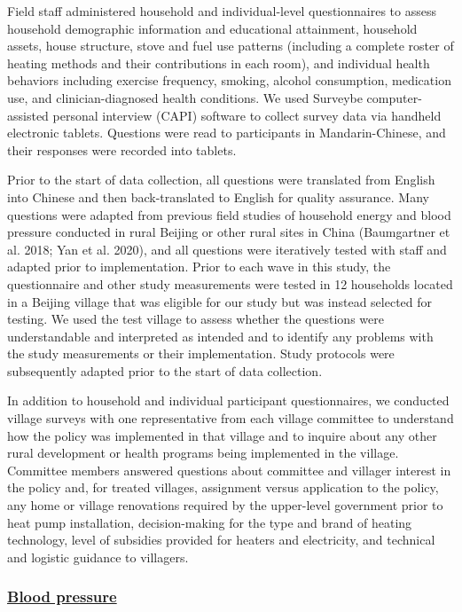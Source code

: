 \documentclass[
  letterpaper,
  DIV=11,
  numbers=noendperiod]{scrartcl}
\providecommand{\DIFadd}[1]{{\protect\color{blue}\underline{#1}}} %
\providecommand{\DIFaddbegin}{} %
\providecommand{\DIFaddend}{} %
\providecommand{\DIFdelbegin}{} %
\providecommand{\DIFdelend}{} %
\newcommand{\DIFscaledelfig}{0.5}
\newlength{\DIFdelgraphicswidth} %
\newlength{\DIFdelgraphicsheight} %
\newcommand{\DIFaddincludegraphics}[2][]{{\color{blue}\fbox{\DIFOincludegraphics[#1]{#2}}}} %
\newcommand{\DIFdelincludegraphics}[2][]{%
\sbox{\DIFdelgraphicsbox}{\DIFOincludegraphics[#1]{#2}}%
\settoboxwidth{\DIFdelgraphicswidth}{\DIFdelgraphicsbox} %
\settoboxtotalheight{\DIFdelgraphicsheight}{\DIFdelgraphicsbox} %
\scalebox{\DIFscaledelfig}{%
\parbox[b]{\DIFdelgraphicswidth}{\usebox{\DIFdelgraphicsbox}\\[-\baselineskip] \rule{\DIFdelgraphicswidth}{0em}}\llap{\resizebox{\DIFdelgraphicswidth}{\DIFdelgraphicsheight}{%
\setlength{\unitlength}{\DIFdelgraphicswidth}%
\begin{picture}(1,1)%
\thicklines\linethickness{2pt} %
{\color[rgb]{1,0,0}\put(0,0){\framebox(1,1){}}}%
{\color[rgb]{1,0,0}\put(0,0){\line( 1,1){1}}}%
{\color[rgb]{1,0,0}\put(0,1){\line(1,-1){1}}}%
\end{picture}%
}\hspace*{3pt}}} %
} %
\DeclareRobustCommand{\DIFaddbegin}{\DIFOaddbegin \let\includegraphics\DIFaddincludegraphics} %
\DeclareRobustCommand{\DIFaddend}{\DIFOaddend \let\includegraphics\DIFOincludegraphics} %
\DeclareRobustCommand{\DIFdelbegin}{\DIFOdelbegin \let\includegraphics\DIFdelincludegraphics} %
\DeclareRobustCommand{\DIFdelend}{\DIFOaddend \let\includegraphics\DIFOincludegraphics} %
\begin{document}
Field staff administered household and individual-level questionnaires
to assess household demographic information and educational attainment,
household assets, house structure, stove and fuel use patterns
(including a complete roster of heating methods and their contributions
in each room), and individual health behaviors including exercise
frequency, smoking, alcohol consumption, medication use, and
clinician-diagnosed health conditions. We used Surveybe
computer-assisted personal interview (CAPI) software to collect survey
data via handheld electronic tablets. Questions were read to
participants in Mandarin-Chinese, and their responses were recorded into
tablets.

Prior to the start of data collection, all questions were translated
from English into Chinese and then back-translated to English for
quality assurance. Many questions were adapted from previous field
studies of household energy and blood pressure conducted in rural
Beijing or other rural sites in China (Baumgartner et al. 2018; Yan et
al. 2020), and all questions were iteratively tested with staff and
adapted prior to implementation. Prior to each wave in this study, the
questionnaire and other study measurements were tested in 12 households
located in a Beijing village that was eligible for our study but was
instead selected for testing. We used the test village to assess whether
the questions were understandable and interpreted as intended and to
identify any problems with the study measurements or their
implementation. Study protocols were subsequently adapted prior to the
start of data collection.

In addition to household and individual participant questionnaires, we
conducted village surveys with one representative from each village
committee to understand how the policy was implemented in that village
and to inquire about any other rural development or health programs
being implemented in the village. Committee members answered questions
about committee and villager interest in the policy and, for treated
villages, assignment versus application to the policy, any home or
village renovations required by the upper-level government prior to heat
pump installation, decision-making for the type and brand of heating
technology, level of subsidies provided for heaters and electricity, and
technical and logistic guidance to villagers.

\DIFdelbegin %
\DIFdelend \DIFaddbegin \subsubsection{\DIFadd{Blood pressure}}\label{blood-pressure}
\DIFaddend 
\end{document}
